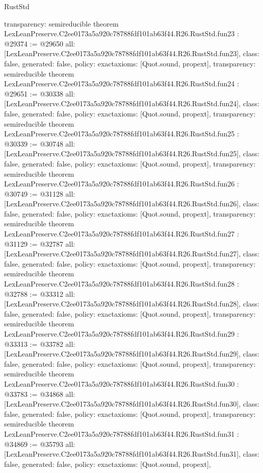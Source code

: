 \begin{lexlean}{RustStd}
\begin{coremodule}
{  transparency: semireducible
}
theorem LexLeanPreserve.C2ee0173a5a920c78788fdf101ab63f44.R26.RustStd.fun23 : @29374 := @29650 {
  all: [LexLeanPreserve.C2ee0173a5a920c78788fdf101ab63f44.R26.RustStd.fun23],
  class: false,
  generated: false,
  policy: exact{axioms: [Quot.sound, propext]},
  transparency: semireducible
}
theorem LexLeanPreserve.C2ee0173a5a920c78788fdf101ab63f44.R26.RustStd.fun24 : @29651 := @30338 {
  all: [LexLeanPreserve.C2ee0173a5a920c78788fdf101ab63f44.R26.RustStd.fun24],
  class: false,
  generated: false,
  policy: exact{axioms: [Quot.sound, propext]},
  transparency: semireducible
}
theorem LexLeanPreserve.C2ee0173a5a920c78788fdf101ab63f44.R26.RustStd.fun25 : @30339 := @30748 {
  all: [LexLeanPreserve.C2ee0173a5a920c78788fdf101ab63f44.R26.RustStd.fun25],
  class: false,
  generated: false,
  policy: exact{axioms: [Quot.sound, propext]},
  transparency: semireducible
}
theorem LexLeanPreserve.C2ee0173a5a920c78788fdf101ab63f44.R26.RustStd.fun26 : @30749 := @31128 {
  all: [LexLeanPreserve.C2ee0173a5a920c78788fdf101ab63f44.R26.RustStd.fun26],
  class: false,
  generated: false,
  policy: exact{axioms: [Quot.sound, propext]},
  transparency: semireducible
}
theorem LexLeanPreserve.C2ee0173a5a920c78788fdf101ab63f44.R26.RustStd.fun27 : @31129 := @32787 {
  all: [LexLeanPreserve.C2ee0173a5a920c78788fdf101ab63f44.R26.RustStd.fun27],
  class: false,
  generated: false,
  policy: exact{axioms: [Quot.sound, propext]},
  transparency: semireducible
}
theorem LexLeanPreserve.C2ee0173a5a920c78788fdf101ab63f44.R26.RustStd.fun28 : @32788 := @33312 {
  all: [LexLeanPreserve.C2ee0173a5a920c78788fdf101ab63f44.R26.RustStd.fun28],
  class: false,
  generated: false,
  policy: exact{axioms: [Quot.sound, propext]},
  transparency: semireducible
}
theorem LexLeanPreserve.C2ee0173a5a920c78788fdf101ab63f44.R26.RustStd.fun29 : @33313 := @33782 {
  all: [LexLeanPreserve.C2ee0173a5a920c78788fdf101ab63f44.R26.RustStd.fun29],
  class: false,
  generated: false,
  policy: exact{axioms: [Quot.sound, propext]},
  transparency: semireducible
}
theorem LexLeanPreserve.C2ee0173a5a920c78788fdf101ab63f44.R26.RustStd.fun30 : @33783 := @34868 {
  all: [LexLeanPreserve.C2ee0173a5a920c78788fdf101ab63f44.R26.RustStd.fun30],
  class: false,
  generated: false,
  policy: exact{axioms: [Quot.sound, propext]},
  transparency: semireducible
}
theorem LexLeanPreserve.C2ee0173a5a920c78788fdf101ab63f44.R26.RustStd.fun31 : @34869 := @35793 {
  all: [LexLeanPreserve.C2ee0173a5a920c78788fdf101ab63f44.R26.RustStd.fun31],
  class: false,
  generated: false,
  policy: exact{axioms: [Quot.sound, propext]},
}
\end{coremodule}
\end{lexlean}
